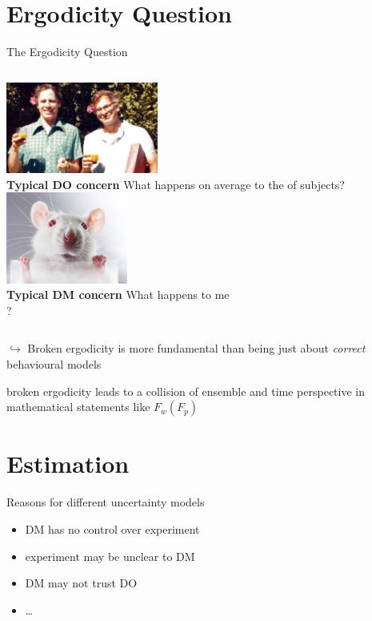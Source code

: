 \section{Ergodicity Question}

\begin{frame}{The Ergodicity Question}
\begin{columns}[T]
	\includegraphics[height=3cm]{img/TverskyKahnemanFunny} \\
	\bc \textbf{Typical DO concern} \ec
	What happens on average to the  of subjects?
\centering \vspace{10em}  \red{\large $\neq$}
	\includegraphics[height=3cm]{img/LabRat} \\
	\bc \textbf{Typical DM concern} \ec
	What happens to me \\
	?
\end{columns}
\vspace{1em}
\pause
\bi
\item[$\hookrightarrow$] Broken ergodicity is more fundamental than being just about \textit{correct} behavioural models
\item broken ergodicity leads to a collision of ensemble and time perspective 
in mathematical statements like $F_w(F_p)$ \ei
\end{frame}


\section{Estimation}

\begin{frame}{Reasons for different uncertainty models}
\begin{itemize}
  \item DM has no control over experiment
  \item experiment may be unclear to DM
  \item DM may not trust DO
  \item \ldots
\end{itemize}
\end{frame}

